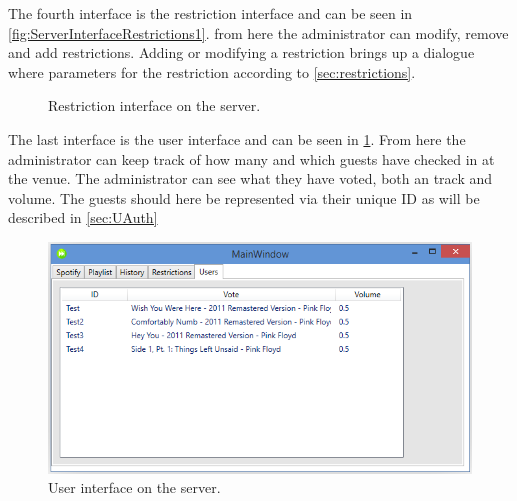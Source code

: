 The fourth interface is the restriction interface and can be seen in \cref{fig:ServerInterfaceRestrictions1}. from here the administrator can modify, remove and add restrictions. Adding or modifying a restriction brings up a dialogue where parameters for the restriction according to \cref{sec:restrictions}.

\begin{figure}[H]
  \centering
  \caption{Restriction interface on the server.}
\end{figure}

The last interface is the user interface and can be seen in \cref{fig:ServerInterfaceUsers}. From here the administrator can keep track of how many and which guests have checked in at the venue. The administrator can see what they have voted, both an track and volume. The guests should here be represented via their unique ID as will be described in \cref{sec:UAuth}
\begin{figure}[hbtp]
  \centering
  \includegraphics[width=\textwidth]{Images/ServerInterfaceUsers.png}
  \caption{User interface on the server.}\label{fig:ServerInterfaceUsers}
\end{figure}